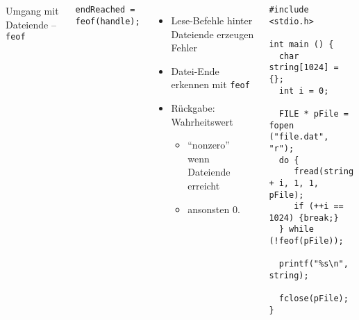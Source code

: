\begin{frame}[fragile]
%
\begin{columns}[T]
\begin{Large}
Umgang mit Dateiende -- \texttt{feof}
\vspace{10pt}
\end{Large}
%
\begin{codebox}[Syntax]
\begin{verbatim}
endReached = feof(handle);
\end{verbatim}
\end{codebox}
%
\begin{itemize}
\item Lese-Befehle hinter Dateiende erzeugen Fehler
\item Datei-Ende erkennen mit \texttt{feof}
\item Rückgabe: Wahrheitswert
	\begin{itemize}
	\item \enquote{nonzero} wenn Dateiende erreicht
	\item ansonsten 0.
	\end{itemize}
\end{itemize}
%
\begin{codebox}
\begin{verbatim}
#include <stdio.h>

int main () {
  char string[1024] = {};
  int i = 0;
  
  FILE * pFile = fopen ("file.dat", "r");
  do {
     fread(string + i, 1, 1, pFile);
     if (++i == 1024) {break;}
  } while (!feof(pFile));

  printf("%s\n", string);  
  
  fclose(pFile);
}
\end{verbatim}
\end{codebox}
\end{columns}
%
\end{frame}


